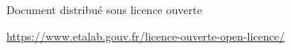 \hspace{-1cm}\textcolor{inrae}{\sffamily \insertdate}\par

\hspace{-1cm}\textcolor{inraefonce}{\sffamily \insertauthor}\par

\vspace*{0.25cm}

\hspace{-1.3cm}
\textcolor{inraefonce}{\sffamily
Document distribué sous licence ouverte}\par
\vspace*{-0.3cm}
\hspace{-1.1cm} \href{https://www.etalab.gouv.fr/licence-ouverte-open-licence/}{https://www.etalab.gouv.fr/licence-ouverte-open-licence/}

\restoregeometry

